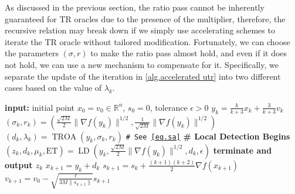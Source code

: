 \documentclass{article}
\begin{document}
As discussed in the previous section, the ratio pass cannot be inherently guaranteed for TR oracles due to the presence of the multiplier, therefore, the recursive relation may break down if we simply use accelerating schemes to iterate the TR oracle without tailored modification. Fortunately, we can choose the parameters $(\sigma,r)$ to make the ratio pass almost hold, and even if it does not hold, we can use a new mechanism to compensate for it. Specifically, we separate the update of the iteration in \autoref{alg.accelerated utr} into two different cases based on the value of $\lambda_k$.
\begin{algorithm}[ht]
    \caption{Accelerated Trust-Region Method (\atr{})}\label{alg.accelerated utr}
    \begin{algorithmic}[1]
        \STATE \textbf{input:} initial point $x_0=v_0\in \mathbb{R}^n$, $s_0=0$, tolerance $\epsilon>0$
        \STATE $y_k = \frac{k}{k+3}x_k+\frac{3}{k+3}v_k$
        \STATE $(\sigma_k,r_k) = (\tfrac{\sqrt{2M}}{2}\|\nabla f(y_k)\|^{1/2},\tfrac{1}{\sqrt{2M}}\|\nabla f(y_k)\|^{1/2})$
        \STATE $(d_k,\lambda_k) = \operatorname{TROA}(y_k,\sigma_k,r_k)$ \hfill\texttt{\# See \eqref{eq.sa}}
         \label{line.if}
        \STATE \textbf{\# Local Detection Begins}
        \STATE $(z_k,d_k,\mu_k,\text{ET}) = \operatorname{LD}(y_k,\tfrac{\sqrt{2M}}{2}\|\nabla f(y_k)\|^{1/2},d_k,\epsilon)$
        \label{line.early terminate main}
        \STATE \textbf{terminate and output $z_k$}
        \ENDIF
        \ENDIF
        \STATE $x_{k+1}=y_k+d_k$
        \STATE $s_{k+1} = s_{k}+\tfrac{(k+1)(k+2)}{2}\nabla f(x_{k+1})$
        \STATE $v_{k+1} = v_0-\sqrt{\tfrac{\ell}{3M\|s_{k+1}\|}}s_{k+1}$
        \ENDFOR
    \end{algorithmic}
\end{algorithm}
\end{document}
